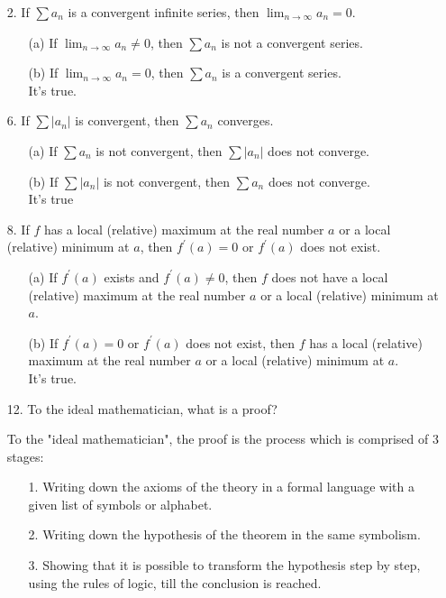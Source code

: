 \documentclass[12pt, a4paper]{article}                  %
\begin{document}
\begin{enumerate}
\item[2.]
If $\sum a_n$ is a convergent infinite series, then $\lim_{n \to \infty} a_n = 0$.
\begin{enumerate}
\item[(a)]
If $\lim_{n \to \infty} a_n \neq 0$, then $\sum a_n$ is not a convergent series.
\item[(b)]
If $\lim_{n \to \infty} a_n = 0$, then $\sum a_n$ is a convergent series.\\
It's true.
\end{enumerate}

\item[6.]
If $\sum |a_n|$ is convergent, then $\sum a_n$ converges.
\begin{enumerate}
\item[(a)]
If $\sum a_n$ is not convergent, then $\sum |a_n|$ does not converge.
\item[(b)]
If $\sum |a_n|$ is not convergent, then $\sum a_n$ does not converge.\\
It's true
\end{enumerate}

\item[8.]
If $f$ has a local (relative) maximum at the real number $a$ or a
local (relative) minimum at $a$, then $f^{'}(a) = 0$ or $f^{'}(a)$ does not exist.
\begin{enumerate}
\item[(a)]
If $f^{'}(a)$ exists and $f^{'}(a) \neq 0$, then $f$ does not have a local
(relative) maximum at the real number $a$ or a local (relative) minimum at $a$.
\item[(b)]
If $f^{'}(a) = 0$ or $f^{'}(a)$ does not exist, then $f$ has a local
(relative) maximum at the real number $a$ or a local (relative) minimum at $a$.\\
It's true.
\end{enumerate}

\item[12.]
To the ideal mathematician, what is a proof?

To the "ideal mathematician", the proof is the process which is comprised of 3 stages:
\begin{enumerate}
\item[1.]
Writing down the axioms of the theory in a formal language with a given list of symbols or alphabet.
\item[2.]
Writing down the hypothesis of the theorem in the same symbolism.
\item[3.]
Showing that it is possible to transform the hypothesis step by step, using the rules of logic, till the conclusion is reached.
\end{enumerate}


\end{enumerate}
\end{document}
